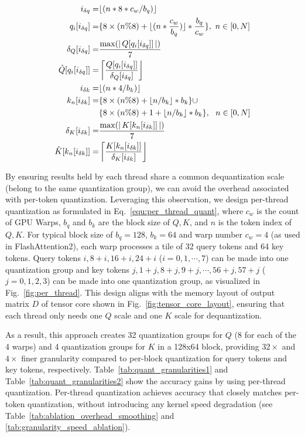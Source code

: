 \begin{align}  \label{equ:per_thread_quant}
    i_{\delta q} =& \lfloor (n*8*c_w/b_q) \rfloor \notag \\
    q_i[i_{\delta q}] =& \{ 8\times(n\%8) + \lfloor (n*\frac{c_w}{b_q}) \rfloor * \frac{b_q}{c_w}\}  , ~  n \in [0, N]  \notag \\
    \delta_{Q}[i_{\delta q}] =& \frac{\max(\left|\,Q[q_i[i_{\delta q}]]\,\right|)}{7} \notag \\ \notag
    \hat Q[q_i[i_{\delta q}]] =& \left\lceil \frac{Q[q_i[i_{\delta q}]]}{\delta_{Q}[i_{\delta q}]} \right\rfloor \\ 
    i_{\delta k} =& \lfloor (n*4/b_{k}) \rfloor  \\ \notag
    k_n[i_{\delta k}] =& \{ 8\times(n\%8) + \lfloor n/b_{k} \rfloor * b_{k} \} \cup \\ &\{ 8\times(n\%8)+1 + \lfloor n/b_{k} \rfloor * b_{k}\}   , ~~  n \in [0, N]  \notag \\
    \delta_{K}[i_{\delta k}] =& \frac{\max(\left|\,K[k_n[i_{\delta k}]]\,\right|)}{7} \notag \\ \notag
    \hat K[k_n[i_{\delta k}]] =& \left\lceil \frac{K[k_n[i_{\delta k}]]}{\delta_{K}[i_{\delta k}]} \right\rfloor
\end{align}


By ensuring results held by each thread share a common dequantization scale (belong to the same quantization group), we can avoid the overhead associated with per-token quantization. Leveraging this observation, we design per-thread quantization as formulated in Eq.~\ref{equ:per_thread_quant}, where $c_w$ is the count of GPU Warps, $b_q$ and $b_k$ are the block size of $Q, K$, and $n$ is the token index of $Q, K$.
For typical block size of $b_q=128$, $b_k=64$ and warp number $c_w=4$ (as used in FlashAttention2), each warp processes a tile of 32 query tokens and 64 key tokens. Query tokens $i,8+i,16+i,24+i$ ($i = 0,1,\cdots,7$) can be made into one quantization group and key tokens $j,1+j,8+j,9+j,\cdots,56+j,57+j$ ($j=0,1,2,3$) can be made into one quantization group, as visualized in Fig.~\ref{fig:per_thread}. This design aligns with the memory layout of output matrix $D$ of tensor core shown in Fig.~\ref{fig:tensor_core_layout}, ensuring that each thread only needs one $Q$ scale and one $K$ scale for dequantization.

As a result, this approach creates 32 quantization groups for $Q$ (8 for each of the 4 warps) and 4 quantization groups for $K$ in a 128x64 block, providing $32\times$ and $4\times$ finer granularity compared to per-block quantization for query tokens and key tokens, respectively. Table~\ref{tab:quant_granularities1} and Table~\ref{tab:quant_granularities2} show the accuracy gains by using per-thread quantization. Per-thread quantization achieves accuracy that closely matches per-token quantization, without introducing any kernel speed degradation (see Table~\ref{tab:ablation_overhead_smoothing} and \ref{tab:granularity_speed_ablation}). 






